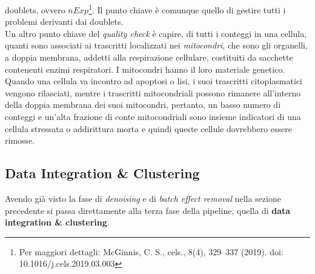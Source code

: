 \documentclass[a4paper,12pt, oneside]{book}
\begin{document}
doublets, ovvero $nExp$\footnote{Per maggiori dettagli: McGinnis, C. S., cels.,
  8(4), 329–337 (2019). doi: 10.1016/j.cels.2019.03.003}.
Il punto chiave è comunque quello di gestire tutti i problemi derivanti dai
doublets. \\
Un altro punto chiave del \textit{quality check} è capire, di tutti i conteggi
in una cellula, quanti sono associati ai trascritti localizzati nei
\textit{mitocondri}, che sono gli organelli, a doppia membrana, addetti alla
respirazione cellulare, costituiti da sacchette contenenti enzimi
respiratori. I mitocondri hanno il loro materiale genetico. Quando una cellula
va incontro ad apoptosi o lisi, i suoi 
trascritti citoplasmatici vengono rilasciati, mentre i trascritti mitocondriali
possono rimanere all'interno della doppia membrana dei suoi mitocondri,
pertanto, un basso numero di conteggi e un'alta frazione di conte mitocondriali
sono insieme indicatori di una cellula stressata o addirittura morta e quindi
queste cellule dovrebbero essere rimosse.   
\subsection{Data Integration \& Clustering}
Avendo già visto la fase di \textit{denoising} e di \textit{batch effect
  removal} nella sezione precedente si passa direttamente alla terza fase della
pipeline, quella di \textbf{data integration \& clustering}.
\end{document}
